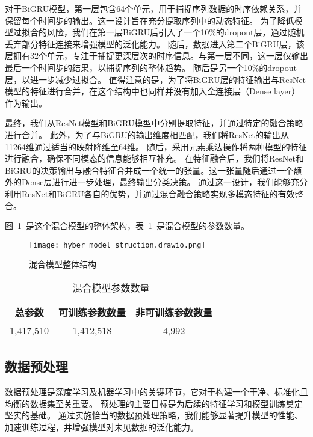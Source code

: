 对于BiGRU模型，第一层包含64个单元，用于捕捉序列数据的时序依赖关系，并保留每个时间步的输出。这一设计旨在充分提取序列中的动态特征。
为了降低模型过拟合的风险，我们在第一层BiGRU后引入了一个10\%的dropout层，通过随机丢弃部分特征连接来增强模型的泛化能力。
随后，数据进入第二个BiGRU层，该层拥有32个单元，专注于捕捉更深层次的时序信息。与第一层不同，这一层仅输出最后一个时间步的结果，以捕捉序列的整体趋势。
随后是另一个10\%的dropout层，以进一步减少过拟合。
值得注意的是，为了将BiGRU层的特征输出与ResNet模型的特征进行合并，在这个结构中也同样并没有加入全连接层（Dense layer）作为输出。\par


最终，我们从ResNet模型和BiGRU模型中分别提取特征，并通过特定的融合策略进行合并。
此外，为了与BiGRU的输出维度相匹配，我们将ResNet的输出从11264维通过适当的映射降维至64维。
随后，采用元素乘法操作将两种模型的特征进行融合，确保不同模态的信息能够相互补充。
在特征融合后，我们将ResNet和BiGRU的决策输出与融合特征合并成一个统一的张量。这一张量随后通过一个额外的Dense层进行进一步处理，最终输出分类决策。
通过这一设计，我们能够充分利用ResNet和BiGRU各自的优势，并通过混合融合策略实现多模态特征的有效整合。

图~\ref{fig:hyber_model_struct}~是这个混合模型的整体架构，表~\ref{tab:model_params}~是混合模型的参数数量。
\begin{figure}[h]
	\centering
	\texttt{[image: hyber\_model\_struction.drawio.png]}
	\caption{混合模型整体结构}
	\label{fig:hyber_model_struct}
\end{figure}



\begin{table}[h]
	\caption{混合模型参数数量}
	\label{tab:model_params}
	\centering
	\begin{tabular}{ccc}
		\toprule
		\textbf{总参数} & \textbf{可训练参数数量} & \textbf{非可训练参数数量} \\
		\midrule
		1,417,510       & 1,412,518               & 4,992                     \\
		\bottomrule
	\end{tabular}
\end{table}
\subsection{数据预处理}
数据预处理是深度学习及机器学习中的关键环节，它对于构建一个干净、标准化且均衡的数据集至关重要。
预处理的主要目标是为后续的特征学习和模型训练奠定坚实的基础。
通过实施恰当的数据预处理策略，我们能够显著提升模型的性能、加速训练过程，并增强模型对未见数据的泛化能力。\par

